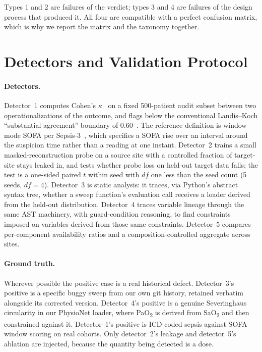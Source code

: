 \documentclass[pmlr,twocolumn,10pt]{jmlr}
\begin{document}
Types 1 and 2 are failures of the verdict; types 3 and 4 are failures of the
design process that produced it. All four are compatible with a perfect
confusion matrix, which is why we report the matrix and the taxonomy together.

\section{Detectors and Validation Protocol}
\label{sec:methods}

\paragraph{Detectors.} Detector~1 computes Cohen's $\kappa$~\citep{cohen1960kappa}
on a fixed 500-patient audit subset between two operationalizations of the
outcome, and flags below the conventional Landis--Koch ``substantial agreement''
boundary of $0.60$~\citep{landis1977measurement}. The reference definition is
window-mode SOFA per Sepsis-3~\citep{singer2016sepsis3}, which specifies a SOFA
rise over an interval around the suspicion time rather than a reading at one
instant. Detector~2 trains a small masked-reconstruction probe on a source site
with a controlled fraction of target-site stays leaked in, and tests whether
probe loss on held-out target data falls; the test is a one-sided paired $t$
within seed with $df$ one less than the seed count (5 seeds, $df=4$). Detector~3 is static analysis: it traces, via
Python's abstract syntax tree, whether a sweep function's evaluation call
receives a loader derived from the held-out distribution. Detector~4 traces
variable lineage through the same AST machinery, with guard-condition reasoning,
to find constraints imposed on variables derived from those same constraints.
Detector~5 compares per-component availability ratios and a
composition-controlled aggregate across sites.

\paragraph{Ground truth.} Wherever possible the positive case is a real
historical defect. Detector~3's positive is a specific buggy sweep from our own
git history, retained verbatim alongside its corrected version. Detector~4's
positive is a genuine Severinghaus circularity in our PhysioNet loader, where
PaO\textsubscript{2} is derived from SaO\textsubscript{2} and then constrained
against it. Detector~1's positive is ICD-coded sepsis against SOFA-window
scoring on real cohorts. Only detector~2's leakage and detector~5's ablation are
injected, because the quantity being detected is a dose.
\end{document}
